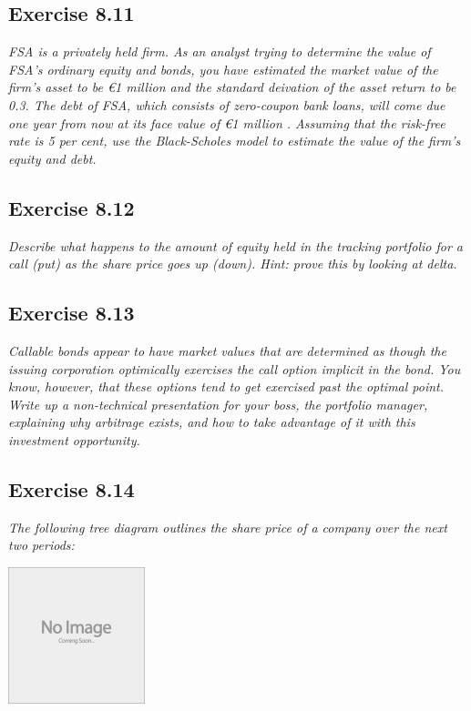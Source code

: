 \documentclass[]{book}
\newcommand{\euro}{€}
\theoremstyle{definition}
\theoremstyle{definition}
\theoremstyle{remark}
\begin{document}
\subsection{Exercise 8.11}\label{exercise-8.11}

\emph{FSA is a privately held firm. As an analyst trying to determine
the value of FSA's ordinary equity and bonds, you have estimated the
market value of the firm's asset to be \euro{}1 million and the standard
deivation of the asset return to be 0.3. The debt of FSA, which consists
of zero-coupon bank loans, will come due one year from now at its face
value of \euro{}1 million . Assuming that the risk-free rate is 5 per
cent, use the Black-Scholes model to estimate the value of the firm's
equity and debt.} \citep[p.272]{book}

\subsection{Exercise 8.12}\label{exercise-8.12}

\emph{Describe what happens to the amount of equity held in the tracking
portfolio for a call (put) as the share price goes up (down). Hint:
prove this by looking at delta.} \citep[p.272]{book}

\subsection{Exercise 8.13}\label{exercise-8.13}

\emph{Callable bonds appear to have market values that are determined as
though the issuing corporation optimically exercises the call option
implicit in the bond. You know, however, that these options tend to get
exercised past the optimal point. Write up a non-technical presentation
for your boss, the portfolio manager, explaining why arbitrage exists,
and how to take advantage of it with this investment opportunity.}
\citep[p.272]{book}

\subsection{Exercise 8.14}\label{exercise-8.14}

\emph{The following tree diagram outlines the share price of a company
over the next two periods:} \citep[p.272]{book}

\begin{center}\includegraphics[width=150px]{figures/placeholder} \end{center}
\end{document}
